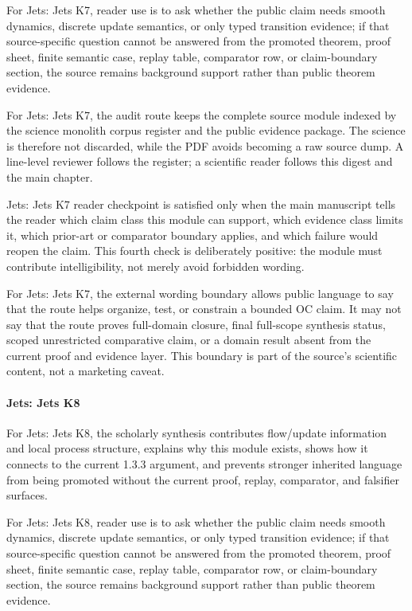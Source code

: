 For Jets: Jets K7, reader use is to ask whether the public claim needs smooth dynamics, discrete update semantics, or only typed transition evidence; if that source-specific question cannot be answered from the promoted theorem, proof sheet, finite semantic case, replay table, comparator row, or claim-boundary section, the source remains background support rather than public theorem evidence.


For Jets: Jets K7, the audit route keeps the complete source module indexed by the science monolith corpus register and the public evidence package. The science is therefore not discarded, while the PDF avoids becoming a raw source dump. A line-level reviewer follows the register; a scientific reader follows this digest and the main chapter.


Jets: Jets K7 reader checkpoint is satisfied only when the main manuscript tells the reader which claim class this module can support, which evidence class limits it, which prior-art or comparator boundary applies, and which failure would reopen the claim. This fourth check is deliberately positive: the module must contribute intelligibility, not merely avoid forbidden wording.


For Jets: Jets K7, the external wording boundary allows public language to say that the route helps organize, test, or constrain a bounded OC claim. It may not say that the route proves full-domain closure, final full-scope synthesis status, scoped unrestricted comparative claim, or a domain result absent from the current proof and evidence layer. This boundary is part of the source's scientific content, not a marketing caveat.


\paragraph{Jets: Jets K8}

For Jets: Jets K8, the scholarly synthesis contributes flow/update information and local process structure, explains why this module exists, shows how it connects to the current 1.3.3 argument, and prevents stronger inherited language from being promoted without the current proof, replay, comparator, and falsifier surfaces.


For Jets: Jets K8, reader use is to ask whether the public claim needs smooth dynamics, discrete update semantics, or only typed transition evidence; if that source-specific question cannot be answered from the promoted theorem, proof sheet, finite semantic case, replay table, comparator row, or claim-boundary section, the source remains background support rather than public theorem evidence.


